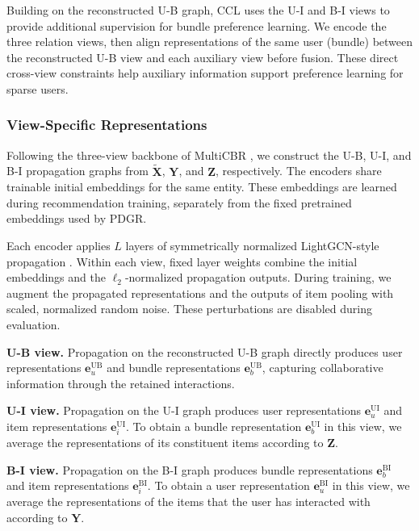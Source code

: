 \documentclass[letterpaper]{article}
\begin{document}
Building on the reconstructed U-B graph, CCL uses the U-I and B-I views to provide additional supervision for bundle preference learning. We encode the three relation views, then align representations of the same user (bundle) between the reconstructed U-B view and each auxiliary view before fusion. These direct cross-view constraints help auxiliary information support preference learning for sparse users.

\subsubsection{View-Specific Representations}

Following the three-view backbone of MultiCBR \cite{ma2024multicbr}, we construct the U-B, U-I, and B-I propagation graphs from $\widetilde{\mathbf X}$, $\mathbf Y$, and $\mathbf Z$, respectively. The encoders share trainable initial embeddings for the same entity. These embeddings are learned during recommendation training, separately from the fixed pretrained embeddings used by PDGR.

Each encoder applies $L$ layers of symmetrically normalized LightGCN-style propagation \cite{he2020lightgcn}. Within each view, fixed layer weights combine the initial embeddings and the $\ell_2$-normalized propagation outputs. During training, we augment the propagated representations and the outputs of item pooling with scaled, normalized random noise. These perturbations are disabled during evaluation.

\textbf{U-B view.} Propagation on the reconstructed U-B graph directly produces user representations $\mathbf e_u^{\mathrm{UB}}$ and bundle representations $\mathbf e_b^{\mathrm{UB}}$, capturing collaborative information through the retained interactions.

\textbf{U-I view.} Propagation on the U-I graph produces user representations $\mathbf e_u^{\mathrm{UI}}$ and item representations $\mathbf e_i^{\mathrm{UI}}$. To obtain a bundle representation $\mathbf e_b^{\mathrm{UI}}$ in this view, we average the representations of its constituent items according to $\mathbf Z$.

\textbf{B-I view.} Propagation on the B-I graph produces bundle representations $\mathbf e_b^{\mathrm{BI}}$ and item representations $\mathbf e_i^{\mathrm{BI}}$. To obtain a user representation $\mathbf e_u^{\mathrm{BI}}$ in this view, we average the representations of the items that the user has interacted with according to $\mathbf Y$.
\end{document}
